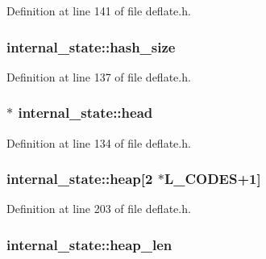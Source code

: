 Definition at line 141 of file deflate.\-h.

\hypertarget{structinternal__state_aad05d6c37eb87eefafca51e05468f349}{
\subsubsection[{hash\-\_\-size}]{ internal\-\_\-state\-::hash\-\_\-size}}\label{structinternal__state_aad05d6c37eb87eefafca51e05468f349}


Definition at line 137 of file deflate.\-h.

\hypertarget{structinternal__state_aafd9ba338599f15de29386ff7a0218f4}{
\subsubsection[{head}]{$\ast$ internal\-\_\-state\-::head}}\label{structinternal__state_aafd9ba338599f15de29386ff7a0218f4}


Definition at line 134 of file deflate.\-h.

\hypertarget{structinternal__state_ad7edb9b1d387e631bc6fde1cad0af758}{
\subsubsection[{heap}]{ internal\-\_\-state\-::heap\mbox{[}2 $\ast$L\-\_\-\-C\-O\-D\-E\-S+1\mbox{]}}}\label{structinternal__state_ad7edb9b1d387e631bc6fde1cad0af758}


Definition at line 203 of file deflate.\-h.

\hypertarget{structinternal__state_a0659e23b0188ac16db58f98ae2b67b6b}{
\subsubsection[{heap\-\_\-len}]{ internal\-\_\-state\-::heap\-\_\-len}}\label{structinternal__state_a0659e23b0188ac16db58f98ae2b67b6b}


